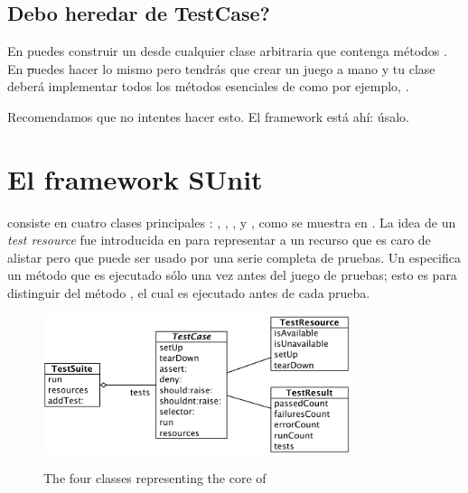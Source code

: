 \documentclass[a4paper,10pt,twoside]{book}
\begin{document}
\subsection{\¿ Debo heredar de TestCase?}

En \JUnit{} puedes construir un  desde cualquier clase arbitraria
que contenga m\'etodos . En \st puedes hacer lo mismo pero tendr\'as
que crear un juego a mano y tu clase deber\'a implementar todos los m\'etodos esenciales de 
  como por ejemplo, .

Recomendamos que no intentes hacer esto. El framework est\'a ah\'i: \'usalo.


\section{El framework SUnit}

\sunit consiste en cuatro clases principales : ,
, , y , como se muestra en .
La idea de un \emph{test resource} fue introducida en  para representar a un recurso
que es caro de alistar pero que puede ser usado por una serie completa de pruebas.  Un 
especifica un m\'etodo  que es ejecutado s\'olo una vez antes del juego de pruebas;
esto es para distinguir del m\'etodo , el cual es ejecutado antes de cada prueba. 


\begin{figure}[htb]
  \begin{center}
		{\includegraphics[width=0.8\textwidth]{sunit-classes}}
	\caption{The four classes representing the core of \SUnit}
  \end{center}
\end{figure}
\end{document}
